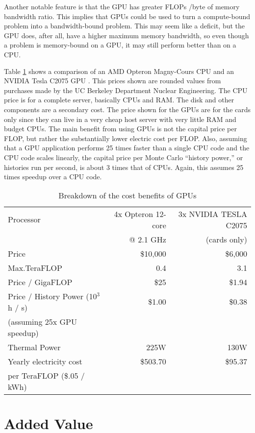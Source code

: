 Another notable feature is that the GPU has greater FLOPs /byte of memory bandwidth ratio.  This implies that GPUs could be used to turn a compute-bound problem into a bandwidth-bound problem.  This may seem like a deficit, but the GPU does, after all, have a higher maximum memory bandwidth, so even though a problem is memory-bound on a GPU, it may still perform better than on a CPU.

Table \ref{gpu_money} shows a comparison of an AMD Opteron Magny-Cours CPU and an NVIDIA Tesla C2075 GPU \cite{cpu_latency,cuda}.  This prices shown are rounded values from purchases made by the UC Berkeley Department Nuclear Engineering.  The CPU price is for a complete server, basically CPUs and RAM.  The disk and  other components are a secondary cost.  The price shown for the GPUs are for the cards only since they can live in a very cheap host server with very little RAM and budget CPUs.  The main benefit from using GPUs is not the capital price per FLOP, but rather the substantially lower electric cost per FLOP.  Also, assuming that a GPU application performs 25 times faster than a single CPU code and the CPU code scales linearly, the capital price per Monte Carlo ``history power,'' or histories run per second, is about 3 times that of CPUs.  Again, this assumes 25 times speedup over a CPU code.  

\begin{table}[h]
\centering
\caption{Breakdown of the cost benefits of GPUs}
\label{gpu_money}
\begin{tabular}{| l | r | r |}
\hline
Processor & 4x Opteron 12-core  & 3x NVIDIA TESLA C2075 \\
  & @ 2.1 GHz &  (cards only)  \\
\hline
\hline
Price & \$10,000 & \$6,000 \\
\hline
Max.TeraFLOP & 0.4 & 3.1 \\
\hline
Price / GigaFLOP & \$25 & \$1.94 \\
\hline
Price / History Power (10$^3$ h / s) & \$1.00 & \$0.38 \\
(assuming 25x GPU speedup) & & \\
\hline
Thermal Power & 225W & 130W \\
\hline
Yearly electricity cost & \$503.70  & \$95.37 \\
per TeraFLOP (\$.05 / kWh)   & & \\
\hline
\end{tabular}
\end{table}

\section{Added Value}

